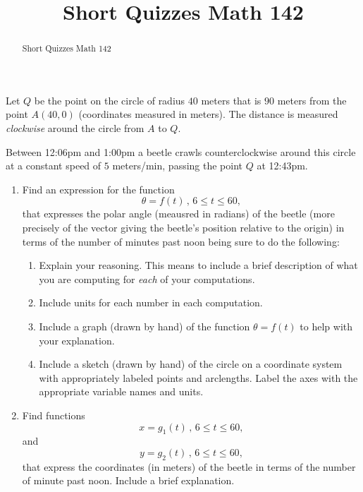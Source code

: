 \documentclass{ximera}
\title{Short Quizzes Math 142}
\begin{document}
\begin{abstract}
Short Quizzes Math 142
\end{abstract}
\maketitle

\begin{question}   \label{Q45hbrgrgrhgr}
Let $Q$ be the point on the circle of radius $40$ meters that is $90$ meters from the point $A(40,0)$ (coordinates measured in meters). The distance is measured \emph{clockwise} around the circle from $A$ to $Q$.

Between 12:06pm and 1:00pm a beetle crawls counterclockwise around this circle at a constant speed of $5$ meters/min, passing the point $Q$ at 12:43pm. 

\begin{enumerate}

\item Find an expression for the function
\[
  \theta = f(t) \, , \, 6\leq t \leq 60,
\]
that expresses the polar angle (meausred in radians) of the beetle (more precisely of the vector giving the beetle's position relative to the origin) in terms of the number of minutes past noon being sure to do the following:

\begin{enumerate}
\item Explain your reasoning. This means to include a brief description of what you are computing for \emph{each} of your computations.

\item Include units for each number in each computation.

\item Include a graph (drawn by hand) of the function $\theta=f(t)$ to help with your explanation. 

\item Include a sketch (drawn by hand) of the circle on a coordinate system with appropriately labeled points and arclengths. Label the axes with the appropriate variable names and units.

\end{enumerate}

\item Find functions
\[
   x = g_1(t)  \, , \, 6\leq t \leq 60,
\]
and
\[
     y = g_2(t) \, , \, 6\leq t \leq 60,
\]
that express the coordinates (in meters) of the beetle in terms of the number of minute past noon. Include a brief explanation.


\end{enumerate}
\end{question}
\end{document}
